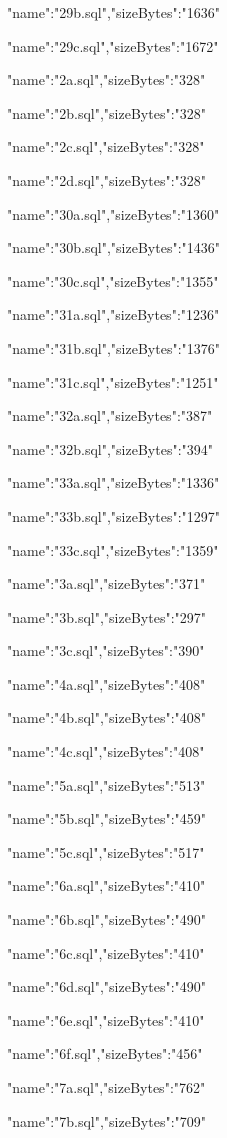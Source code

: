 \documentclass[11pt,a4paper]{article}
\begin{document}
{"name":"29b.sql","sizeBytes":"1636"}

{"name":"29c.sql","sizeBytes":"1672"}

{"name":"2a.sql","sizeBytes":"328"}

{"name":"2b.sql","sizeBytes":"328"}

{"name":"2c.sql","sizeBytes":"328"}

{"name":"2d.sql","sizeBytes":"328"}

{"name":"30a.sql","sizeBytes":"1360"}

{"name":"30b.sql","sizeBytes":"1436"}

{"name":"30c.sql","sizeBytes":"1355"}

{"name":"31a.sql","sizeBytes":"1236"}

{"name":"31b.sql","sizeBytes":"1376"}

{"name":"31c.sql","sizeBytes":"1251"}

{"name":"32a.sql","sizeBytes":"387"}

{"name":"32b.sql","sizeBytes":"394"}

{"name":"33a.sql","sizeBytes":"1336"}

{"name":"33b.sql","sizeBytes":"1297"}

{"name":"33c.sql","sizeBytes":"1359"}

{"name":"3a.sql","sizeBytes":"371"}

{"name":"3b.sql","sizeBytes":"297"}

{"name":"3c.sql","sizeBytes":"390"}

{"name":"4a.sql","sizeBytes":"408"}

{"name":"4b.sql","sizeBytes":"408"}

{"name":"4c.sql","sizeBytes":"408"}

{"name":"5a.sql","sizeBytes":"513"}

{"name":"5b.sql","sizeBytes":"459"}

{"name":"5c.sql","sizeBytes":"517"}

{"name":"6a.sql","sizeBytes":"410"}

{"name":"6b.sql","sizeBytes":"490"}

{"name":"6c.sql","sizeBytes":"410"}

{"name":"6d.sql","sizeBytes":"490"}

{"name":"6e.sql","sizeBytes":"410"}

{"name":"6f.sql","sizeBytes":"456"}

{"name":"7a.sql","sizeBytes":"762"}

{"name":"7b.sql","sizeBytes":"709"}
\end{document}

